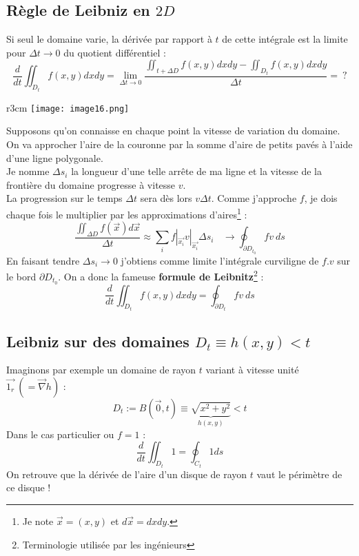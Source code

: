 \documentclass[11pt, a4paper, openany]{book}
\begin{document}
									
		\subsection{Règle de Leibniz en $2D$}
		Si seul le domaine varie, la dérivée par rapport à $t$ de cette intégrale est la limite pour $\Delta t \rightarrow 0$ du quotient différentiel :
		\begin{equation}
			\frac{d}{dt} \iint_{D_t} f(x,y) dxdy = \lim\limits_{\Delta t \rightarrow 0} \dfrac{\iint_{t + \Delta D} f(x,y) dxdy - \iint_{D_t} f(x,y)dxdy}{\Delta t} =\  ?
		\end{equation}
		\begin{wrapfigure}[10]{r}{3cm}
			\texttt{[image: image16.png]}
		\end{wrapfigure}
		Supposons qu'on connaisse en chaque point la vitesse de variation du domaine. On va approcher l'aire de la couronne par la somme d'aire de petits pavés à l'aide d'une ligne polygonale. \\
									
		Je nomme $\Delta s_i$ la longueur d'une telle arrête de ma ligne et la vitesse de la frontière du domaine progresse à vitesse $v$.\\
		La progression sur le temps $\Delta t$ sera dès lors $v\Delta t$. Comme j'approche $f$, je dois chaque fois le multiplier par les approximations d'aires\footnote{Je note $\vec{x} = (x,y)$ et $d\vec{x} = dxdy$.} :
		\begin{equation}
			\dfrac{\iint_{\Delta D} f(\vec{x})d\vec{x}}{\Delta t} \approx \sum_i f|_{\vec{x_i}}v|_{\vec{x_i}}\Delta s_i \ \ \ \ \rightarrow \oint_{\partial D_{t_0}}fv\ ds
		\end{equation}
		En faisant tendre $\Delta s_i \rightarrow 0$ j'obtiens comme limite l'intégrale curviligne de $f.v$ sur le bord $\partial D_{t_0}$.
		On a donc la fameuse \textbf{formule de Leibnitz}\footnote{Terminologie utilisée par les ingénieurs} :
		\begin{equation}
			\frac{d}{dt}\iint_{D_t} f(x,y) dx dy = \oint_{\partial D_t}fv\ ds
		\end{equation}
									
		\subsection{Leibniz sur des domaines $D_t \equiv h(x,y) <t$}
		Imaginons par exemple un domaine de rayon $t$ variant à vitesse unité $\vec{1_r}\ (= \vec{\nabla}h)$ :
		\begin{equation}
			D_t := B(\vec{0},t) \equiv \underbrace{\sqrt{x^2 + y^2}}_{h(x,y)} < t
		\end{equation}
		Dans le cas particulier ou $f=1$ :
		\begin{equation}
			\frac{d}{dt}\iint_{D_t} 1 = \oint_{C_t} 1 ds
		\end{equation}
		On retrouve que la dérivée de l'aire d'un disque de rayon $t$ vaut le périmètre de ce disque !\\
									
\end{document}
